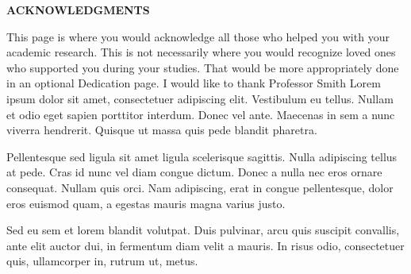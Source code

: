 \newpage
{}
\setcounter{page}{2}

\centerline{\bf \large ACKNOWLEDGMENTS}
\vspace{10mm} %
This page is where you would acknowledge all those who helped
you with your academic research. This is not necessarily where
you would recognize loved ones who supported you during your
studies. That would be more appropriately done in an optional
Dedication page. I would like to thank Professor Smith Lorem
ipsum dolor sit amet, consectetuer adipiscing elit. Vestibulum
eu tellus. Nullam et odio eget sapien porttitor interdum. Donec
vel ante. Maecenas in sem a nunc viverra hendrerit. Quisque ut
massa quis pede blandit pharetra. \par Pellentesque sed ligula
sit amet ligula scelerisque sagittis. Nulla adipiscing tellus
at pede. Cras id nunc vel diam congue dictum. Donec a nulla nec
eros ornare consequat. Nullam quis orci. Nam adipiscing, erat
in congue pellentesque, dolor eros euismod quam, a egestas
mauris magna varius justo. \par Sed eu sem et lorem blandit
volutpat. Duis pulvinar, arcu quis suscipit convallis, ante
elit auctor dui, in fermentum diam velit a mauris. In risus
odio, consectetuer quis, ullamcorper in, rutrum ut, metus.
